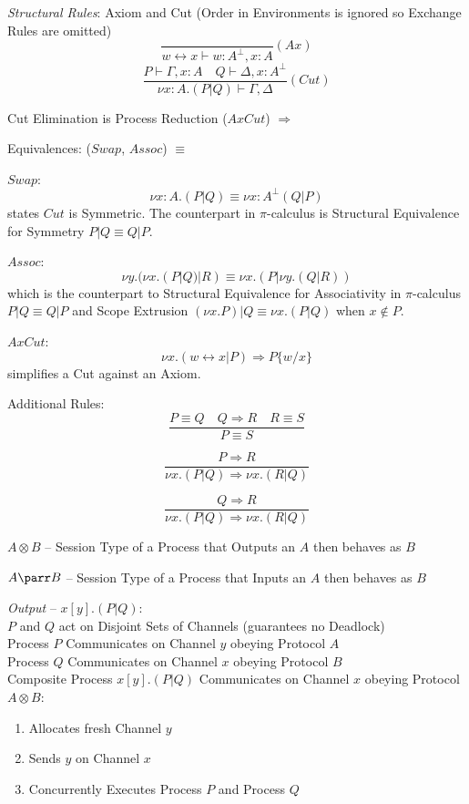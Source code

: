 \emph{Structural Rules}: Axiom and Cut (Order in Environments is
ignored so Exchange Rules are omitted)
\[
  \frac{
  }{
    w \leftrightarrow x \vdash w:A^\bot, x:A
  }(Ax)
\]\[
  \frac{
    P \vdash \Gamma, x:A \quad Q \vdash \Delta, x:A^\bot
  }{
    \nu x:A.(P|Q) \vdash \Gamma, \Delta
  }(Cut)
\]

Cut Elimination is Process Reduction ($AxCut$) $\Longrightarrow$

Equivalences: ($Swap$, $Assoc$) $\equiv$

$Swap$:
\[
  \nu x:A.(P|Q) \equiv \nu x:A^\bot(Q|P)
\]
states $Cut$ is Symmetric. The counterpart in $\pi$-calculus is
Structural Equivalence for Symmetry $P | Q \equiv Q | P$.

$Assoc$:
\[
  \nu y.(\nu x.(P | Q) | R) \equiv \nu x.(P | \nu y.(Q | R))
\]
which is the counterpart to Structural Equivalence for Associativity
in $\pi$-calculus $P | Q \equiv Q | P$ and Scope Extrusion $(\nu x.P)
| Q \equiv \nu x.(P|Q)$ when $x \notin P$.

$AxCut$:
\[
  \nu x.(w \leftrightarrow x | P) \Longrightarrow P \{w/x\}
\]
simplifies a Cut against an Axiom.


Additional Rules:
\[
  \frac{P \equiv Q \quad Q \Longrightarrow R \quad R \equiv S}
  {P \equiv S}
\]

\[
  \frac{P \Longrightarrow R}
  {\nu x.(P|Q) \Longrightarrow \nu x.(R|Q)}
\]

\[
  \frac{Q \Longrightarrow R}
  {\nu x.(P|Q) \Longrightarrow \nu x.(R|Q)}
\]

\asterism

$A \otimes B$ -- Session Type of a Process that Outputs an $A$ then
behaves as $B$

$A \parr B$ -- Session Type of a Process that Inputs an $A$ then
behaves as $B$

\emph{Output} -- $x[y].(P|Q)$: \\
$P$ and $Q$ act on Disjoint Sets of Channels
(guarantees no Deadlock) \\
Process $P$ Communicates on Channel $y$ obeying Protocol $A$ \\
Process $Q$ Communicates on Channel $x$ obeying Protocol $B$ \\
Composite Process $x[y].(P|Q)$ Communicates on Channel $x$ obeying
Protocol $A \otimes B$:
\begin{enumerate}
  \item Allocates fresh Channel $y$
  \item Sends $y$ on Channel $x$
  \item Concurrently Executes Process $P$ and Process $Q$
\end{enumerate}

